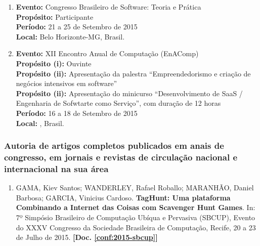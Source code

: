 \documentclass[a4paper,oneside,10pt]{article}
\begin{document}
\begin{enumerate}
\renewcommand{\labelenumi}{{\large\bfseries\arabic{enumi}.}}

\item   \textbf{Evento:} Congresso Brasileiro de Software: Teoria e Prática \mbox{} \\
        \textbf{Propósito:} Participante\\
        \textbf{Período:} 21 a 25 de Setembro de 2015\\
        \textbf{Local:} Belo Horizonte-MG, Brasil.

\item   \textbf{Evento:} XII Encontro Anual de Computação (EnAComp) \mbox{} \\
        \textbf{Propósito (i):} Ouvinte\\
        \textbf{Propósito (ii):} Apresentação da palestra ``Empreendedorismo e criação de negócios intensivos em software''\\
        \textbf{Propósito (ii):} Apresentação do minicurso ``Desenvolvimento de SaaS / Engenharia de Sofwtarte como Serviço'', com duração de 12 horas\\
        \textbf{Período:} 16 a 18 de Setembro de 2015\\
        \textbf{Local:} , Brasil.

\end{enumerate}

\subsubsection{Autoria de artigos completos publicados em anais de congresso, em jornais e revistas de circulação nacional e internacional na sua área}
\vspace{0.3cm}

\begin{enumerate}
\renewcommand{\labelenumi}{{\large\bfseries\arabic{enumi}.}}

\item GAMA, Kiev Santos; WANDERLEY, Rafael Roballo; MARANHÃO, Daniel Barbosa; GARCIA, Vinicius Cardoso. \textbf{TagHunt: Uma plataforma Combinando a Internet das Coisas com Scavenger Hunt Games}. In: 7º Simpósio Brasileiro de Computação Ubíqua e Pervasiva (SBCUP), Evento do XXXV Congresso da Sociedade Brasileira de Computação, Recife, 20 a 23 de Julho de 2015. \textbf{[Doc. \ref{conf:2015-sbcup}]}

\end{enumerate}
\end{document}
